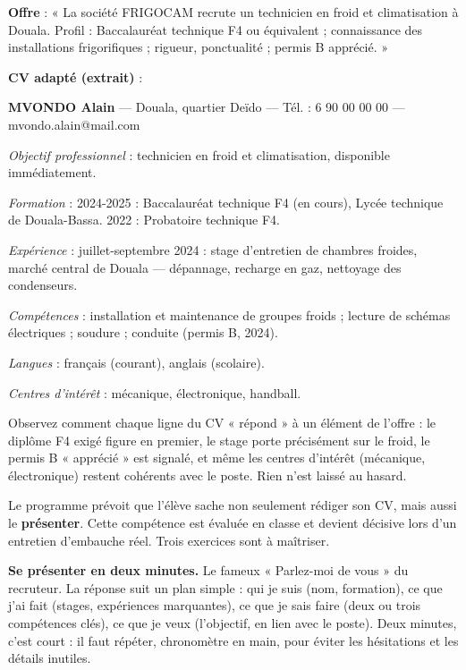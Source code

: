 \documentclass[11pt]{article}
\newcounter{popsec}
\newcounter{popsub}
\newcommand{\courssub}[1]{%
  \stepcounter{popsub}%
  \par\vspace{9pt}\noindent{\popxbold\fontsize{11.5}{13}\selectfont\color{popink}{\color{poporange}\thepopsec.\thepopsub}\hspace{6pt}#1}\par\nopagebreak\vspace{4pt}
}
\begin{document}
\begin{exemplebox}
\textbf{Offre} : « La société FRIGOCAM recrute un technicien en froid et climatisation à Douala. Profil : Baccalauréat technique F4 ou équivalent ; connaissance des installations frigorifiques ; rigueur, ponctualité ; permis B apprécié. »

\textbf{CV adapté (extrait)} :

\textbf{MVONDO Alain} — Douala, quartier Deïdo — Tél. : 6 90 00 00 00 — mvondo.alain@mail.com

\emph{Objectif professionnel} : technicien en froid et climatisation, disponible immédiatement.

\emph{Formation} : 2024-2025 : Baccalauréat technique F4 (en cours), Lycée technique de Douala-Bassa. 2022 : Probatoire technique F4.

\emph{Expérience} : juillet-septembre 2024 : stage d'entretien de chambres froides, marché central de Douala — dépannage, recharge en gaz, nettoyage des condenseurs.

\emph{Compétences} : installation et maintenance de groupes froids ; lecture de schémas électriques ; soudure ; conduite (permis B, 2024).

\emph{Langues} : français (courant), anglais (scolaire).

\emph{Centres d'intérêt} : mécanique, électronique, handball.
\end{exemplebox}

Observez comment chaque ligne du CV « répond » à un élément de l'offre : le diplôme F4 exigé figure en premier, le stage porte précisément sur le froid, le permis B « apprécié » est signalé, et même les centres d'intérêt (mécanique, électronique) restent cohérents avec le poste. Rien n'est laissé au hasard.

\courssub{Présenter son CV à l'oral}

Le programme prévoit que l'élève sache non seulement rédiger son CV, mais aussi le \textbf{présenter}. Cette compétence est évaluée en classe et devient décisive lors d'un entretien d'embauche réel. Trois exercices sont à maîtriser.

\textbf{Se présenter en deux minutes.} Le fameux « Parlez-moi de vous » du recruteur. La réponse suit un plan simple : qui je suis (nom, formation), ce que j'ai fait (stages, expériences marquantes), ce que je sais faire (deux ou trois compétences clés), ce que je veux (l'objectif, en lien avec le poste). Deux minutes, c'est court : il faut répéter, chronomètre en main, pour éviter les hésitations et les détails inutiles.
\end{document}
